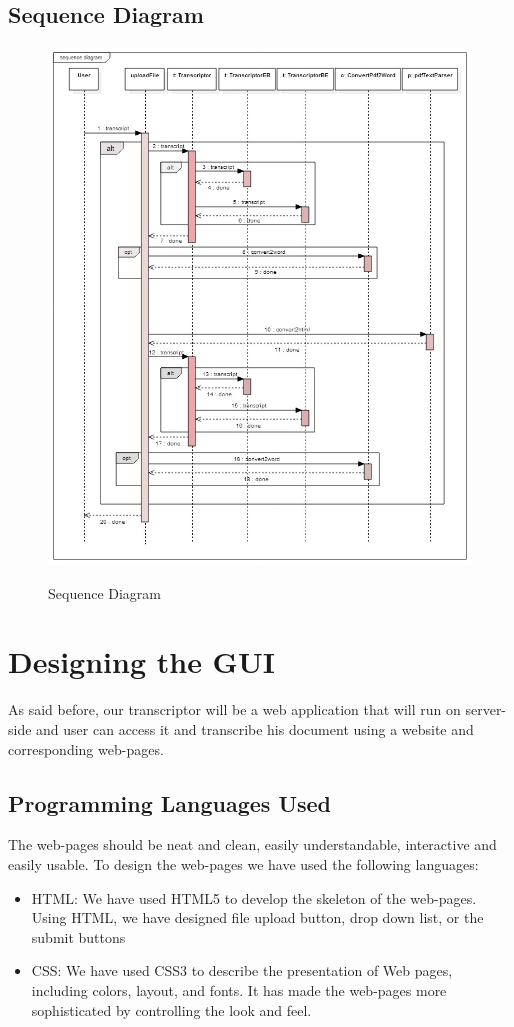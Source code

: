 \documentclass[12pt,oneside,openany,a4paper]{book}
\begin{document}
\subsection{Sequence Diagram}
\begin{figure}[H]
		\caption{Sequence Diagram}
		\centering
		\includegraphics[scale=0.56]{sequence}
		\label{fig:sequencediagram}
\end{figure} 

\section{Designing the GUI}
As said before, our transcriptor will be a web application that will run on server-side and user can access it and transcribe his document using a website and corresponding web-pages. 
\subsection{Programming Languages Used}
The web-pages should be neat and clean, easily understandable, interactive and easily usable. To design the web-pages we have used the following languages:
\begin{itemize}
\item {HTML: We have used HTML5 to develop the skeleton of the web-pages. Using HTML, we have designed file upload button, drop down list, or the submit buttons}
\item {CSS: We have used CSS3 to describe the presentation of Web pages, including colors, layout, and fonts. It has made the web-pages more sophisticated by controlling the look and feel.}
\end{itemize}
\end{document}
